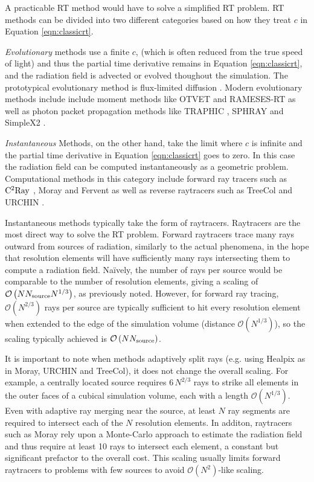 \documentclass[fleq,usenatbib]{mnras}
\newcommand{\bigO}[1]{\mathcal{O}\left(#1\right)}
\newcommand{\NS}{N_{\rm source}}
\begin{document}
A practicable RT method would have to solve a simplified RT problem. RT 
methods can be divided into two different categories based on how they treat 
$c$ in Equation \ref{eqn:classicrt}.

\textit{Evolutionary} methods use a 
finite $c$, (which is often reduced from the true speed of light) and thus the 
partial time derivative remains in Equation \ref{eqn:classicrt}, and the 
radiation field is advected or evolved thoughout the simulation. The 
prototypical evolutionary method is flux-limited diffusion 
\citep{levermorePomraning81}. Modern evolutionary methods include include 
moment methods like OTVET \citep{gnedinAbel01} and RAMESES-RT 
\citep{rosdahlEt13} as well as photon packet propagation methods like TRAPHIC 
\citep{pawlikSchaye08}, SPHRAY \citep{altayEt08} and SimpleX2 
\citep{paardekooperEt10}.

\textit{Instantaneous} Methods,  on the other hand, take the limit where $c$ 
is infinite and the partial time derivative in Equation \ref{eqn:classicrt} 
goes to zero. In this case the radiation field can be computed instantaneously 
as a geometric problem. Computational methods in this category include forward 
ray tracers such as $\rm C^2Ray$ \citep{mellemaEt06a}, Moray 
\citep{wiseAbel11} and Fervent \citep{baczynskiEt15} as well as reverse 
raytracers such as TreeCol \citep{clarkEt12} and URCHIN \citep{altayTheuns13}. 

Instantaneous methods typically take the form of raytracers. Raytracers are 
the most direct way to solve the RT problem. Forward raytracers 
trace many rays outward from sources of radiation, similarly to the actual 
phenomena, in the hope that resolution elements will have sufficiently many 
rays intersecting them to compute a radiation field. Na\"ively, the number of 
rays per source would be comparable to the number of resolution elements, 
giving a scaling of $\bigO{N \NS N^{1/3}}$, as previously noted. However, for 
forward ray tracing, $\bigO{N^{2/3}}$ rays per source are typically sufficient 
to hit every resolution element when extended to the edge of the simulation 
volume (distance $\bigO{N^{1/3}}$), so the scaling typically achieved is 
$\bigO{N \NS}$.  

It is important to note when methods adaptively split rays (e.g. using Healpix 
\citealt{gorskiEt05} as in Moray, URCHIN and TreeCol), it does not change the 
overall scaling.  For example, a centrally located source requires $6\, N^{2/3}$ 
rays to strike all elements in the outer faces of a cubical simulation volume, 
each with a length $\bigO{N^{1/3}}$. Even with adaptive ray merging near the 
source, at least $N$ ray segments are required to intersect each of the $N$ 
resolution elements. In additon, raytracers such as Moray rely upon a 
Monte-Carlo approach to estimate the radiation field and thus require at least 
10 rays to intersect each element, a constant but significant prefactor to the 
overall cost. This scaling usually limits forward raytracers to problems with 
few sources to avoid $\mathcal{O}(N^2)$-like scaling. 
\end{document}

